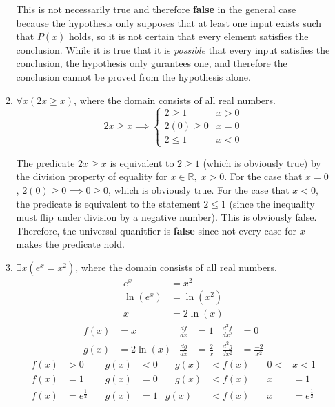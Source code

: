 \documentclass[letterpaper, 12pt]{article}
\begin{document}
\begin{enumerate}
\begin{enumerate}
\begin{flushleft}
    This is not necessarily true and therefore \textbf{false} in the general case because the 
    hypothesis only supposes that at least one input exists such that $P(x)$ holds, so it is 
    not certain that every element satisfies the conclusion. While it is true that it is 
    \textit{possible} that every input satisfies the conclusion, the hypothesis only gurantees 
    one, and therefore the conclusion cannot be proved from the hypothesis alone.
\end{flushleft}
\item $\forall x(2x \ge x)$, where the domain consists of all real numbers.
\[2x \ge x \implies
\begin{cases}
    2 \ge 1 & x > 0 \\
    2(0) \ge 0 & x = 0 \\
    2 \le 1 & x < 0
\end{cases}\]
\begin{flushleft}
    The predicate $2x \ge x$ is equivalent to $2 \ge 1$ (which is obviously true) by the division
    property of equality for $x \in \mathbb{R}, \; x > 0$. For the case that $x = 0$,
    $2(0) \ge 0 \implies 0 \ge 0$, which is obviously true. For the case that $x < 0$, the 
    predicate is equivalent to the statement $2 \le 1$ (since the inequality must flip under 
    division by a negative number). This is obviously false. Therefore, the universal quanitfier 
    is \textbf{false} since not every case for $x$ makes the predicate hold.
\end{flushleft}
\pagebreak
\item $\exists x(e^x = x^2)$, where the domain consists of all real numbers.
\begin{align*}
    e^x &= x^2 \\
    \ln(e^x) &= \ln(x^2) \\
    x &= 2\ln(x)
\end{align*}
\begin{align*}
    f(x) &= x & \frac{df}{dx} &= 1 & \frac{d^2f}{dx^2} &= 0 \\
    g(x) &= 2\ln(x) & \frac{dg}{dx} &= \frac{2}{x} & \frac{d^2g}{dx^2} &= \frac{-2}{x^2}
\end{align*}
\begin{align*}
    f(x) &> 0 &\quad g(x) &< 0 &\quad g(x) &< f(x) &\quad 0 < &x < 1 \\
    f(x) &= 1 &\quad g(x) &= 0 &\quad g(x) &< f(x) &\quad x &= 1 \\
    f(x) &= e^{\frac{1}{2}} &\quad g(x) &= 1 & g(x) &< f(x) &\quad x &= e^{\frac{1}{2}} \\

\end{align*}
\end{enumerate}
\end{enumerate}
\end{document}
